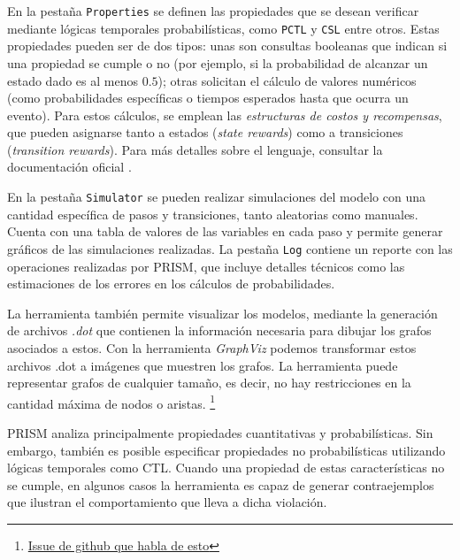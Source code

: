 \documentclass[runningheads]{llncs}
\begin{document}
En la pestaña \texttt{Properties} se definen las propiedades que se desean verificar mediante lógicas temporales probabilísticas, como \texttt{PCTL} y \texttt{CSL} entre otros. Estas propiedades pueden ser de dos tipos: unas son consultas booleanas que indican si una propiedad se cumple o no (por ejemplo, si la probabilidad de alcanzar un estado dado es al menos $0.5$); otras solicitan el cálculo de valores numéricos (como probabilidades específicas o tiempos esperados hasta que ocurra un evento). Para estos cálculos, se emplean las \textit{estructuras de costos y recompensas}, que pueden asignarse tanto a estados (\textit{state rewards}) como a transiciones (\textit{transition rewards}). Para más detalles sobre el lenguaje, consultar la documentación oficial \cite{PRISMManual}.

En la pestaña \texttt{Simulator} se pueden realizar simulaciones del modelo con una cantidad específica de pasos y transiciones, tanto aleatorias como manuales. Cuenta con una tabla de valores de las variables en cada paso y permite generar gráficos de las simulaciones realizadas. La pestaña \texttt{Log} contiene un reporte con las operaciones realizadas por PRISM, que incluye detalles técnicos como las estimaciones de los errores en los cálculos de probabilidades. 

La herramienta también permite visualizar los modelos, mediante la generación de archivos \textit{.dot} que contienen la información necesaria para dibujar los grafos asociados a estos. Con la herramienta \textit{GraphViz} podemos transformar estos archivos .dot a imágenes que muestren los grafos. La herramienta puede representar grafos de cualquier tamaño, es decir, no hay restricciones en la cantidad máxima de nodos o aristas. \footnote[1]{\href{https://github.com/marbl/MetagenomeScope/issues/28}{Issue de github que habla de esto}}

PRISM analiza principalmente propiedades cuantitativas y probabilísticas. Sin embargo, también es posible especificar propiedades no probabilísticas utilizando lógicas temporales como CTL. Cuando una propiedad de estas características no se cumple, en algunos casos la herramienta es capaz de generar contraejemplos que ilustran el comportamiento que lleva a dicha violación.
\end{document}
